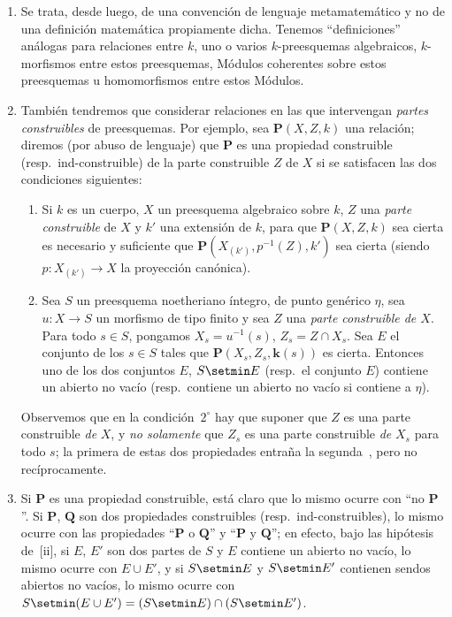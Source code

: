 \begin{remarks}[9.2.2]
\label{IV.9.2.2}
\begin{enumerate}[label=(\roman*)]
  \item Se trata, desde luego, de una convención de lenguaje metamatemático y no de una definición matemática propiamente dicha.
Tenemos ``definiciones'' análogas para relaciones entre $k$, uno o varios $k$-preesquemas algebraicos, $k$-morfismos entre estos preesquemas, Módulos coherentes sobre estos preesquemas u homomorfismos entre estos Módulos.
  \item También tendremos que considerar relaciones en las que intervengan \emph{partes construibles} de preesquemas.
Por ejemplo, sea $\boldsymbol{P}(X,Z,k)$ una relación; diremos (por abuso de lenguaje) que $\boldsymbol{P}$ es una propiedad construible (resp.\ ind-construible) de la parte construible $Z$ de $X$ si se satisfacen las dos condiciones siguientes:
\begin{enumerate}[label=$\arabic*^{\mathrm{o}}$]
  \item Si $k$ es un cuerpo, $X$ un preesquema algebraico sobre $k$, $Z$ una \emph{parte construible} de $X$ y $k'$ una extensión de $k$, para que $\boldsymbol{P}(X,Z,k)$ sea cierta es necesario y suficiente que $\boldsymbol{P}(X_{(k')},p^{-1}(Z),k')$ sea cierta (siendo $p:X_{(k')}\to X$ la proyección canónica).
  \item Sea $S$ un preesquema noetheriano íntegro, de punto genérico $\eta$, sea $u:X\to S$ un morfismo de tipo finito y sea $Z$ una \emph{parte construible de $X$}.
Para todo $s\in S$, pongamos $X_s=u^{-1}(s)$, $Z_s=Z\cap X_s$.
Sea $E$ el conjunto de los $s\in S$ tales que $\boldsymbol{P}(X_s,Z_s,\boldsymbol{k}(s))$ es cierta.
Entonces uno de los dos conjuntos $E$, $S\setmin E$ (resp.\ el conjunto $E$) contiene un abierto no vacío (resp.\ contiene un abierto no vacío si contiene a $\eta$).
\end{enumerate}

Observemos que en la condición~$2^\circ$ hay que suponer que $Z$ es una parte construible \emph{de} $X$, y \emph{no solamente} que $Z_s$ es una parte construible \emph{de} $X_s$ para todo $s$; la primera de estas dos propiedades entraña la segunda~, pero no recíprocamente.

  \item Si $\boldsymbol{P}$ es una propiedad construible, está claro que lo mismo ocurre con ``no $\boldsymbol{P}$''.
Si $\boldsymbol{P}$, $\boldsymbol{Q}$ son dos propiedades construibles (resp.\ ind-construibles), lo mismo ocurre con las propiedades ``$\boldsymbol{P}$ o $\boldsymbol{Q}$'' y ``$\boldsymbol{P}$ y $\boldsymbol{Q}$''; en efecto, bajo las hipótesis de~[ii], si $E$, $E'$ son dos partes de $S$ y $E$ contiene un abierto no vacío, lo mismo ocurre con $E\cup E'$, y si $S\setmin E$ y $S\setmin E'$ contienen sendos abiertos no vacíos, lo mismo ocurre con $S\setmin(E\cup E')=(S\setmin E)\cap(S\setmin E')$.


\end{enumerate}
\end{remarks}
